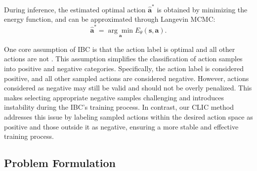 During inference, the estimated optimal action \(\hat{\bm a}^*\) is obtained by minimizing the energy function, and can be approximated through Langevin MCMC:
\[
\hat{\bm a}^* = \underset{\bm a}{ \arg\min} E_\theta(\bm s, \bm a).
\]


One core assumption of IBC is that the action label is optimal and all other actions are not \cite{2022_implicit_BC}.
This assumption simplifies the classification of action samples into positive and negative categories. 
Specifically, 
the action label is considered positive, and all other sampled actions are considered negative.
However, actions considered as negative may still be valid and should not be overly penalized.
This makes selecting appropriate negative samples challenging and introduces instability during the IBC's training process.
In contrast, our CLIC method addresses this issue by labeling sampled actions within the desired action space as positive and those outside it as negative, ensuring a more stable and effective training process.



\subsection{Problem Formulation}


